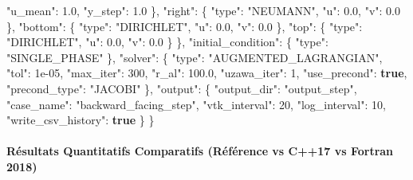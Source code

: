 \documentclass[
  10pt,
]{article}
\newenvironment{Shaded}{}{}
\newcommand{\DataTypeTok}[1]{\textcolor[rgb]{0.56,0.13,0.00}{#1}}
\newcommand{\DecValTok}[1]{\textcolor[rgb]{0.25,0.63,0.44}{#1}}
\newcommand{\FloatTok}[1]{\textcolor[rgb]{0.25,0.63,0.44}{#1}}
\newcommand{\FunctionTok}[1]{\textcolor[rgb]{0.02,0.16,0.49}{#1}}
\newcommand{\KeywordTok}[1]{\textcolor[rgb]{0.00,0.44,0.13}{\textbf{#1}}}
\newcommand{\StringTok}[1]{\textcolor[rgb]{0.25,0.44,0.63}{#1}}
\begin{document}
\begin{Shaded}
\begin{Highlighting}[]
      \DataTypeTok{"u\_mean"}\FunctionTok{:} \FloatTok{1.0}\FunctionTok{,}
      \DataTypeTok{"y\_step"}\FunctionTok{:} \FloatTok{1.0}
    \FunctionTok{\},}
    \DataTypeTok{"right"}\FunctionTok{:} \FunctionTok{\{}
      \DataTypeTok{"type"}\FunctionTok{:} \StringTok{"NEUMANN"}\FunctionTok{,}
      \DataTypeTok{"u"}\FunctionTok{:} \FloatTok{0.0}\FunctionTok{,}
      \DataTypeTok{"v"}\FunctionTok{:} \FloatTok{0.0}
    \FunctionTok{\},}
    \DataTypeTok{"bottom"}\FunctionTok{:} \FunctionTok{\{}
      \DataTypeTok{"type"}\FunctionTok{:} \StringTok{"DIRICHLET"}\FunctionTok{,}
      \DataTypeTok{"u"}\FunctionTok{:} \FloatTok{0.0}\FunctionTok{,}
      \DataTypeTok{"v"}\FunctionTok{:} \FloatTok{0.0}
    \FunctionTok{\},}
    \DataTypeTok{"top"}\FunctionTok{:} \FunctionTok{\{}
      \DataTypeTok{"type"}\FunctionTok{:} \StringTok{"DIRICHLET"}\FunctionTok{,}
      \DataTypeTok{"u"}\FunctionTok{:} \FloatTok{0.0}\FunctionTok{,}
      \DataTypeTok{"v"}\FunctionTok{:} \FloatTok{0.0}
    \FunctionTok{\}}
  \FunctionTok{\},}
  \DataTypeTok{"initial\_condition"}\FunctionTok{:} \FunctionTok{\{}
    \DataTypeTok{"type"}\FunctionTok{:} \StringTok{"SINGLE\_PHASE"}
  \FunctionTok{\},}
  \DataTypeTok{"solver"}\FunctionTok{:} \FunctionTok{\{}
    \DataTypeTok{"type"}\FunctionTok{:} \StringTok{"AUGMENTED\_LAGRANGIAN"}\FunctionTok{,}
    \DataTypeTok{"tol"}\FunctionTok{:} \DecValTok{1e{-}05}\FunctionTok{,}
    \DataTypeTok{"max\_iter"}\FunctionTok{:} \DecValTok{300}\FunctionTok{,}
    \DataTypeTok{"r\_al"}\FunctionTok{:} \FloatTok{100.0}\FunctionTok{,}
    \DataTypeTok{"uzawa\_iter"}\FunctionTok{:} \DecValTok{1}\FunctionTok{,}
    \DataTypeTok{"use\_precond"}\FunctionTok{:} \KeywordTok{true}\FunctionTok{,}
    \DataTypeTok{"precond\_type"}\FunctionTok{:} \StringTok{"JACOBI"}
  \FunctionTok{\},}
  \DataTypeTok{"output"}\FunctionTok{:} \FunctionTok{\{}
    \DataTypeTok{"output\_dir"}\FunctionTok{:} \StringTok{"output\_step"}\FunctionTok{,}
    \DataTypeTok{"case\_name"}\FunctionTok{:} \StringTok{"backward\_facing\_step"}\FunctionTok{,}
    \DataTypeTok{"vtk\_interval"}\FunctionTok{:} \DecValTok{20}\FunctionTok{,}
    \DataTypeTok{"log\_interval"}\FunctionTok{:} \DecValTok{10}\FunctionTok{,}
    \DataTypeTok{"write\_csv\_history"}\FunctionTok{:} \KeywordTok{true}
  \FunctionTok{\}}
\FunctionTok{\}}
\end{Highlighting}
\end{Shaded}

\paragraph{Résultats Quantitatifs Comparatifs (Référence vs C++17 vs
Fortran
2018)}\label{ruxe9sultats-quantitatifs-comparatifs-ruxe9fuxe9rence-vs-c17-vs-fortran-2018-5}
\end{document}

